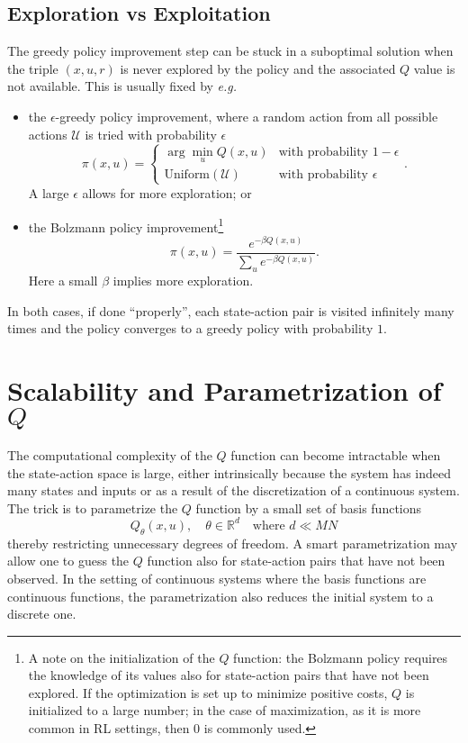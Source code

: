 \subsection{Exploration vs Exploitation}

The greedy policy improvement step can be stuck in a suboptimal solution when the triple $(x,u,r)$ is never explored by the policy and the associated $Q$ value is not available. This is usually fixed by \textit{e.g.}
\begin{itemize}
\item the $\epsilon$-greedy policy improvement, where a random action from all possible actions $\mathcal{U}$ is tried with probability $\epsilon$
  \begin{equation}
    \label{eq:epsilon-greedy-policy-improvement}
    \pi(x,u) =
    \begin{cases}
      \arg \min_u Q(x,u) & \text{with probability }1-\epsilon \\
      \text{Uniform}(\mathcal{U}) & \text{with probability }\epsilon
    \end{cases}.
  \end{equation}
  A large $\epsilon$ allows for more exploration; or
\item the Bolzmann policy improvement\footnote{A note on the initialization of the $Q$ function: the Bolzmann policy requires the knowledge of its values also for state-action pairs that have not been explored. If the optimization is set up to minimize positive costs, $Q$ is initialized to a large number; in the case of maximization, as it is more common in RL settings, then $0$ is commonly used.}
  \begin{equation*}
  \pi(x,u) = \frac{e^{-\beta Q(x,u)}}{\sum_u e^{-\beta Q(x,u)}}.
\end{equation*}
Here a small $\beta$ implies more exploration.
\end{itemize}
In both cases, if done ``properly'', each state-action pair is visited infinitely many times and the policy converges to a greedy policy with probability $1$.

\section{Scalability and Parametrization of $Q$}
\label{sec:RL-Q-parametrization}

The computational complexity of the $Q$ function can become intractable when the state-action space is large, either intrinsically because the system has indeed many states and inputs or as a result of the discretization of a continuous system. The trick is to parametrize the $Q$ function by a small set of basis functions
\begin{equation*}
  Q_\theta(x,u),\quad \theta \in\mathbb{R}^d\quad \text{where } d\ll MN
\end{equation*}
thereby restricting unnecessary degrees of freedom. A smart parametrization may allow one to guess the $Q$ function also for state-action pairs that have not been observed. In the setting of continuous systems where the basis functions are continuous functions, the parametrization also reduces the initial system to a discrete one.

